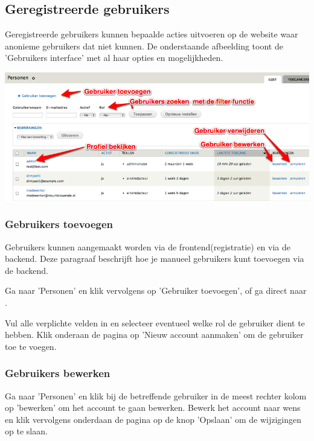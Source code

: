 \subsection{Geregistreerde gebruikers}\label{geregistreerdegebruikers}

Geregistreerde gebruikers kunnen bepaalde acties uitvoeren op de website waar anonieme gebruikers dat niet kunnen. 
De onderstaande afbeelding toont de 'Gebruikers interface' met al haar opties en mogelijkheden.

\bigskip

\begin{center}
	\includegraphics[width=\textwidth]{img/gebruikers1.png}
\end{center}

\subsubsection{Gebruikers toevoegen}

Gebruikers kunnen aangemaakt worden via de frontend(registratie) en via de backend. Deze paragraaf beschrijft hoe je manueel gebruikers kunt toevoegen via de backend. 

Ga naar 'Personen' en klik vervolgens op 'Gebruiker toevoegen', of ga direct naar .

Vul alle verplichte velden in en selecteer eventueel welke rol de gebruiker dient te hebben.
Klik onderaan de pagina op 'Nieuw account aanmaken' om de gebruiker toe te voegen.

\subsubsection{Gebruikers bewerken}

Ga naar 'Personen' en klik bij de betreffende gebruiker in de meest rechter kolom op 'bewerken' om het account te gaan bewerken. 
Bewerk het account naar wens en klik vervolgens onderdaan de pagina op de knop 'Opslaan' om de wijzigingen op te slaan.

